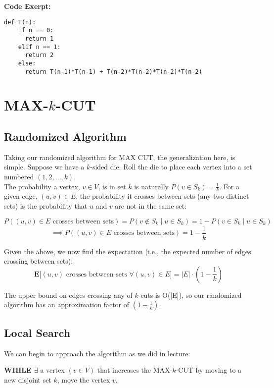 \documentclass[conference]{styles/acmsiggraph}
\newcommand{\?}{\stackrel{?}{=}}
\DeclareRobustCommand{\mybox}[2][gray!20]{%
\begin{tcolorbox}[   %
        breakable,
        left=0pt,
        right=0pt,
        top=0pt,
        bottom=0pt,
        colback=#1,
        colframe=#1,
        width=\dimexpr\textwidth\relax, 
        enlarge left by=0mm,
        boxsep=5pt,
        arc=0pt,outer arc=0pt,
        ]
        #2
\end{tcolorbox}
}
\begin{document}
\newpage

\textbf{Code Exerpt:}\\
\begin{verbatim}
def T(n):
    if n == 0:
      return 1
    elif n == 1:
      return 2
    else:
      return T(n-1)*T(n-1) + T(n-2)*T(n-2)*T(n-2)*T(n-2)
\end{verbatim}


\newpage


\section{MAX-$k$-CUT}
\subsection{Randomized Algorithm}
Taking our randomized algorithm for MAX CUT, the generalization here, is simple.  Suppose we have a $k$-sided die.  Roll the die to place each vertex into a set numbered $(1,2,\ldots, k)$.\\

The probability a vertex, $v \in V$, is in set $k$ is naturally $P(v \in S_k) = \frac{1}{k}$.  For a given edge, $(u,v) \in E$, the probability it crosses between sets (any two distinct sets) is the probability that $u$ and $v$ are not in the same set:

$$ P((u,v) \in E \text{ crosses between sets}) = P(v \notin S_k \mid u \in S_k) = 1 - P(v \in S_k \mid u \in S_k)$$
$$\implies P((u,v) \in E \text{ crosses between sets}) =  1 - \frac{1}{k}$$

\mybox{
Given the above, we now find the expectation (i.e., the expected number of edges crossing between sets):
$$\mathbf{E[}(u,v)\text{ crosses between sets } \forall (u,v) \in E\mathbf{]} = |E| \cdot \left (1 - \frac{1}{k}\right)$$

The upper bound on edges crossing any of $k$-cuts is O(|E|), so our randomized algorithm has an approximation factor of $\left (1 - \frac{1}{k}\right)$.
}


\subsection{Local Search}
We can begin to approach the algorithm as we did in lecture:

\mybox{
\textbf{WHILE $\exists$} a vertex $(v \in V)$ that increases the MAX-$k$-CUT by moving to a new disjoint set $k$, move the vertex $v$.}
\end{document}
